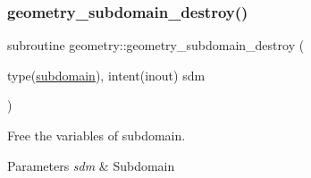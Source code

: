 \subsubsection{\texorpdfstring{geometry\+\_\+subdomain\+\_\+destroy()}{geometry\_subdomain\_destroy()}}
{\footnotesize\ttfamily subroutine geometry\+::geometry\+\_\+subdomain\+\_\+destroy (\begin{DoxyParamCaption}\item[{type(\hyperlink{structgeometry_1_1subdomain}{subdomain}), intent(inout)}]{sdm }\end{DoxyParamCaption})}



Free the variables of subdomain. 


\begin{DoxyParams}{Parameters}
{\em sdm} & Subdomain \\
\hline
\end{DoxyParams}
